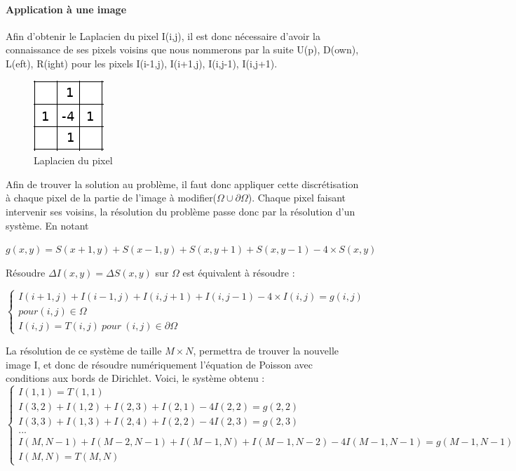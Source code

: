 \paragraph{Application à une image }
Afin d'obtenir le Laplacien du pixel I(i,j), il est donc nécessaire d'avoir la connaissance de ses pixels voisins que nous nommerons par la suite U(p), D(own), L(eft), R(ight) pour les pixels I(i-1,j), I(i+1,j), I(i,j-1), I(i,j+1). 

\begin{figure}[!h]
\centering
    \includegraphics[scale = 0.8]{Images/Laplacian.png}
    \caption{Laplacien du pixel}
\end{figure}
Afin de trouver la solution au problème, il faut donc appliquer cette discrétisation à chaque pixel de la partie de l'image à modifier($\Omega \cup \partial \Omega$). Chaque pixel faisant intervenir ses voisins, la résolution du problème passe donc par la résolution d'un système.
En notant
\begin{center}
 $g(x,y) = S(x+1,y) + S(x-1,y)+ S(x,y+1) + S(x,y-1) - 4\times S(x,y)$\\
 \end{center}
Résoudre $\Delta I(x,y) = \Delta S(x,y)$ sur $\Omega$ est équivalent à résoudre :\\
\begin{center}
\begin{equation*}
    \left \{
    \begin{aligned}
    I(i+1,j) + I(i-1,j)+ I(i,j+1) + I(i, j-1) - 4\times 			I(i,j)= g(i,j)\\ pour (i,j)\in \Omega \\
    I(i,j) = T(i,j) \ pour \ (i,j) \in \partial \Omega
    \end{aligned}
    \right.
\end{equation*}
\end{center}
La résolution de ce système de taille $M\times N $, permettra de trouver la nouvelle image I, et donc de résoudre numériquement l'équation de Poisson avec conditions aux bords de Dirichlet. Voici, le système obtenu : 
\begin{equation}
\left\{
\begin{aligned}
I(1,1) = T(1,1)\\
I(3,2)+I(1,2)+ I(2,3)+I(2,1)-4I(2,2) =g(2,2) \\
I(3,3)+I(1,3)+ I(2,4)+I(2,2)-4I(2,3) =g(2,3)             \\
... \\
I(M,N-1)+I(M-2,N-1)+ I(M-1,N)+I(M-1,N-2)-4I(M-1,N-1) =g(M-1,N-1)\\
I(M, N) = T(M, N)
\end{aligned}
\right.
\end{equation}

